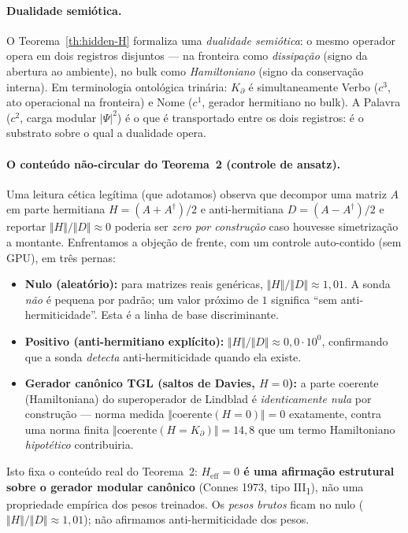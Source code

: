 \documentclass[12pt,a4paper]{article}
\newcommand{\Kpartial}{K_{\partial}}
\begin{document}
\paragraph{Dualidade semiótica.}
O Teorema~\ref{th:hidden-H} formaliza uma \emph{dualidade semiótica}: o
mesmo operador opera em dois registros disjuntos --- na fronteira como
\emph{dissipação} (signo da abertura ao ambiente), no bulk como
\emph{Hamiltoniano} (signo da conservação interna).  Em terminologia
ontológica trinária: $\Kpartial$ é simultaneamente Verbo ($c^{3}$, ato
operacional na fronteira) e Nome ($c^{1}$, gerador hermitiano no bulk).
A Palavra ($c^{2}$, carga modular $|\Psi|^{2}$) é o que é transportado
entre os dois registros: é o substrato sobre o qual a dualidade opera.

\paragraph{O conteúdo não-circular do Teorema~2 (controle de ansatz).}
Uma leitura cética legítima (que adotamos) observa que decompor uma matriz
$A$ em parte hermitiana $H=(A+A^{\dagger})/2$ e anti-hermitiana $D=(A-A^{\dagger})/2$
e reportar $\Vert H\Vert/\Vert D\Vert\approx 0$ poderia ser \emph{zero por
construção} caso houvesse simetrização a montante.  Enfrentamos a objeção
de frente, com um controle auto-contido (sem GPU), em três pernas:
\begin{itemize}
  \item \textbf{Nulo (aleatório):} para matrizes reais genéricas,
        $\Vert H\Vert/\Vert D\Vert \approx 1{,}01$.  A sonda
        \emph{não} é pequena por padrão; um valor próximo de $1$ significa
        ``sem anti-hermiticidade''.  Esta é a linha de base discriminante.
  \item \textbf{Positivo (anti-hermitiano explícito):}
        $\Vert H\Vert/\Vert D\Vert \approx 0{,}0 \cdot 10^{0}$, confirmando
        que a sonda \emph{detecta} anti-hermiticidade quando ela existe.
  \item \sloppy \textbf{Gerador canônico TGL (saltos de Davies, $H=0$):} a parte
        coerente (Hamiltoniana) do superoperador de Lindblad é
        \emph{identicamente nula} por construção --- norma medida
        $\Vert\text{coerente}(H{=}0)\Vert = 0$
        exatamente, contra uma norma finita
        $\Vert\text{coerente}(H{=}\Kpartial)\Vert = 14{,}8$ que um
        termo Hamiltoniano \emph{hipotético} contribuiria.
\end{itemize}
Isto fixa o conteúdo real do Teorema~2: \textbf{$H_{\text{eff}}=0$ é uma
afirmação estrutural sobre o gerador modular canônico} (Connes 1973,
tipo III\textsubscript{1}), não uma propriedade empírica dos pesos treinados.
Os \emph{pesos brutos} ficam no nulo ($\Vert H\Vert/\Vert D\Vert\approx
1{,}01$); não afirmamos anti-hermiticidade dos pesos.
\end{document}
